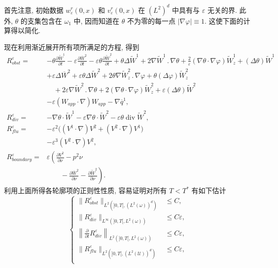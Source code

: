 \begin{sloppypar}
{}%
首先注意, 初始数据 $w_\varepsilon^r(0,x)$ 和 $v_\varepsilon^r(0,x)$ 在 $(L^2)^d$ 中具有与 $\varepsilon$ 无关的界. 此外, $\theta$ 的支集包含在 $\omega_1$ 中, 因而知道在 $\theta$ 不为零的每一点 $|\nabla\varphi|\equiv1$. 这使下面的计算得以简化.

现在利用渐近展开所有项所满足的方程, 得到
\[
\begin{aligned}
R_{obst}^\varepsilon={}&-\theta\frac{\partial\widetilde W^1}{\partial t}
-\varepsilon\frac{\partial\overline W^2}{\partial t}
-\varepsilon\theta\frac{\partial\widetilde W^2}{\partial t}
+\theta\Delta\widetilde W^1+2\nabla\widetilde W^1\mathbin{.}\nabla\theta
+\frac2\varepsilon(\nabla\theta\cdot\nabla\varphi)\widetilde W^1_z
+(\Delta\theta)\widetilde W^1\\
&+\varepsilon\Delta\overline W^2+\varepsilon\theta\Delta\widetilde W^2
+2\theta\nabla\widetilde W^2_z\mathbin{.}\nabla\varphi
+\theta(\Delta\varphi)\widetilde W^2_z\\
&\quad
+2\varepsilon\nabla\widetilde W^2\mathbin{.}\nabla\theta
+2(\nabla\theta\cdot\nabla\varphi)\widetilde W^2_z
+\varepsilon(\Delta\theta)\widetilde W^2\\
&-\varepsilon(W_{app}\cdot\nabla)W_{app}-\nabla\overline q^1,\\
R_{div}^\varepsilon={}&-\nabla\theta\cdot\widetilde W^1
-\varepsilon\nabla\theta\cdot\widetilde W^2
-\varepsilon\theta\operatorname{div}\widetilde W^2,\\
R_{flu}^\varepsilon={}&-\varepsilon^2\bigl((V^1\cdot\nabla)V^2+(V^2\cdot\nabla)V^1\bigr)\\
&-\varepsilon^3(V^2\cdot\nabla)V^2,\\
R_{boundary}^\varepsilon={}&\varepsilon\left(
\frac{\partial V^2}{\partial\nu}-p^2\nu\right.\\
&\left.\qquad-\frac{\partial\overline W^2}{\partial\nu}
-\frac{\partial\widetilde W^2}{\partial\nu}\right).
\end{aligned}
\]
利用上面所得各轮廓项的正则性性质, 容易证明对所有 $T<T^*$ 有如下估计
\begin{equation}
\left\{
\begin{aligned}
 \|R_{obst}^\varepsilon\|_{L^2(]0,T[,(L^2(\omega))^d)}&\leq C,\\
 \|R_{div}^\varepsilon\|_{L^\infty(]0,T[,L^2(\omega))}&\leq C\varepsilon,\\
 \left\|\frac{\partial}{\partial t}R_{div}^\varepsilon\right\|_{L^2(]0,T[,L^2(\omega))}&\leq C\varepsilon,\\
 \|R_{flu}^\varepsilon\|_{L^2(]0,T[,(L^2(\mathcal U))^d)}&\leq C\varepsilon,\\

\end{aligned}
\end{equation}
\end{sloppypar}
